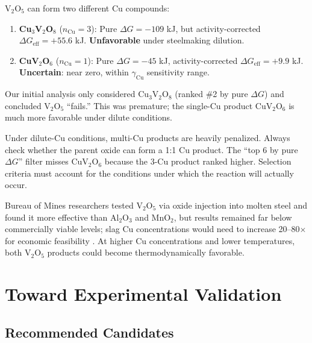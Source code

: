 \documentclass[11pt]{article}
\begin{document}
V$_2$O$_5$ can form two different Cu compounds:

\begin{enumerate}[leftmargin=*]
    \item \textbf{Cu$_3$V$_2$O$_8$} ($n_{\text{Cu}} = 3$): Pure $\Delta G = -109$ kJ, but activity-corrected $\Delta G_{\text{eff}} = +55.6$ kJ. \textbf{Unfavorable} under steelmaking dilution.

    \item \textbf{CuV$_2$O$_6$} ($n_{\text{Cu}} = 1$): Pure $\Delta G = -45$ kJ, activity-corrected $\Delta G_{\text{eff}} = +9.9$ kJ. \textbf{Uncertain}: near zero, within $\gamma_{\text{Cu}}$ sensitivity range.
\end{enumerate}

Our initial analysis only considered Cu$_3$V$_2$O$_8$ (ranked \#2 by pure $\Delta G$) and concluded V$_2$O$_5$ ``fails.'' This was premature; the single-Cu product CuV$_2$O$_6$ is much more favorable under dilute conditions.

\begin{insight}
Under dilute-Cu conditions, multi-Cu products are heavily penalized. Always check whether the parent oxide can form a 1:1 Cu product. The ``top 6 by pure $\Delta G$'' filter misses CuV$_2$O$_6$ because the 3-Cu product ranked higher. Selection criteria must account for the conditions under which the reaction will actually occur.
\end{insight}

Bureau of Mines researchers tested V$_2$O$_5$ via oxide injection into molten steel and found it more effective than Al$_2$O$_3$ and MnO$_2$, but results remained far below commercially viable levels; slag Cu concentrations would need to increase 20--80$\times$ for economic feasibility \cite{911metallurgist}. At higher Cu concentrations and lower temperatures, both V$_2$O$_5$ products could become thermodynamically favorable.


\section{Toward Experimental Validation}

\subsection{Recommended Candidates}
\end{document}

